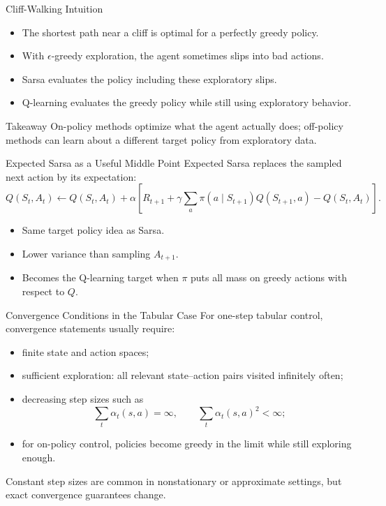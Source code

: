 \documentclass[aspectratio=169]{beamer}
\begin{document}
\begin{frame}{Cliff-Walking Intuition}
\small
\begin{itemize}
    \item The shortest path near a cliff is optimal for a perfectly greedy policy.
    \item With $\epsilon$-greedy exploration, the agent sometimes slips into bad actions.
    \item Sarsa evaluates the policy including these exploratory slips.
    \item Q-learning evaluates the greedy policy while still using exploratory behavior.
\end{itemize}

\vspace{0.9em}
\begin{block}{Takeaway}
On-policy methods optimize what the agent actually does; off-policy methods can learn about a different target policy from exploratory data.
\end{block}
\end{frame}

\begin{frame}{Expected Sarsa as a Useful Middle Point}
\small
Expected Sarsa replaces the sampled next action by its expectation:
\[
Q(S_t,A_t)\leftarrow Q(S_t,A_t)+\alpha
\left[
R_{t+1}+\gamma\sum_a\pi(a\mid S_{t+1})Q(S_{t+1},a)-Q(S_t,A_t)
\right].
\]

\vspace{0.7em}
\begin{itemize}
    \item Same target policy idea as Sarsa.
    \item Lower variance than sampling $A_{t+1}$.
    \item Becomes the Q-learning target when $\pi$ puts all mass on greedy actions with respect to $Q$.
\end{itemize}
\end{frame}

\begin{frame}{Convergence Conditions in the Tabular Case}
\small
For one-step tabular control, convergence statements usually require:

\begin{itemize}
    \item finite state and action spaces;
    \item sufficient exploration: all relevant state--action pairs visited infinitely often;
    \item decreasing step sizes such as
    \[
    \sum_t \alpha_t(s,a)=\infty,\qquad
    \sum_t \alpha_t(s,a)^2<\infty;
    \]
    \item for on-policy control, policies become greedy in the limit while still exploring enough.
\end{itemize}

\vspace{0.5em}
Constant step sizes are common in nonstationary or approximate settings, but exact convergence guarantees change.
\end{frame}
\end{document}
